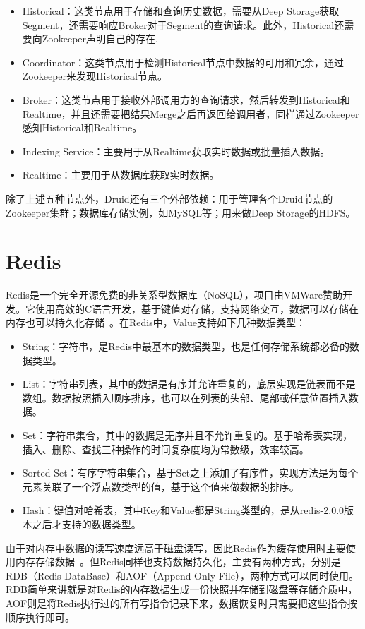 \begin{itemize}
    \item Historical：这类节点用于存储和查询历史数据，需要从Deep Storage获取Segment，还需要响应Broker对于Segment的查询请求。此外，Historical还需要向Zookeeper声明自己的存在.
    \item Coordinator：这类节点用于检测Historical节点中数据的可用和冗余，通过Zookeeper来发现Historical节点。
    \item Broker：这类节点用于接收外部调用方的查询请求，然后转发到Historical和Realtime，并且还需要把结果Merge之后再返回给调用者，同样通过Zookeeper感知Historical和Realtime。
    \item Indexing Service：主要用于从Realtime获取实时数据或批量插入数据。
    \item Realtime：主要用于从数据库获取实时数据。
\end{itemize}

除了上述五种节点外，Druid还有三个外部依赖：用于管理各个Druid节点的Zookeeper集群；数据库存储实例，如MySQL等；用来做Deep Storage的HDFS。

\section{Redis}
Redis是一个完全开源免费的非关系型数据库（NoSQL），项目由VMWare赞助开发。它使用高效的C语言开发，基于键值对存储，支持网络交互，数据可以存储在内存也可以持久化存储~\cite{zch2017}。在Redis中，Value支持如下几种数据类型：

\begin{itemize}
    \item String：字符串，是Redis中最基本的数据类型，也是任何存储系统都必备的数据类型。
    \item List：字符串列表，其中的数据是有序并允许重复的，底层实现是链表而不是数组。数据按照插入顺序排序，也可以在列表的头部、尾部或任意位置插入数据。
    \item Set：字符串集合，其中的数据是无序并且不允许重复的。基于哈希表实现，插入、删除、查找三种操作的时间复杂度均为常数级，效率较高。
    \item 	Sorted Set：有序字符串集合，基于Set之上添加了有序性，实现方法是为每个元素关联了一个浮点数类型的值，基于这个值来做数据的排序。
    \item Hash：键值对哈希表，其中Key和Value都是String类型的，是从redis-2.0.0版本之后才支持的数据类型。
\end{itemize}

由于对内存中数据的读写速度远高于磁盘读写，因此Redis作为缓存使用时主要使用内存存储数据~\cite{wyl2019}。但Redis同样也支持数据持久化，主要有两种方式，分别是RDB（Redis DataBase）和AOF（Append Only File），两种方式可以同时使用。RDB简单来讲就是对Redis的内存数据生成一份快照并存储到磁盘等存储介质中，AOF则是将Redis执行过的所有写指令记录下来，数据恢复时只需要把这些指令按顺序执行即可。


